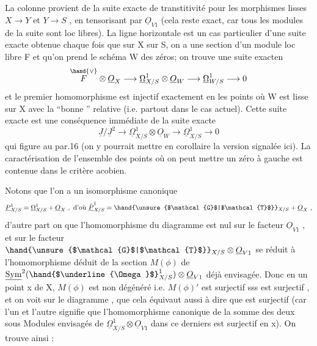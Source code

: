 
La colonne provient de la suite exacte de transtitivité pour les
morphismes lisses $X\to Y$ et $Y\to S$ , en  tensorisant par $\underline{O}_{V1}$ (cela reste
exact, car tous les modules de la suite sont loc libres). La ligne
horizontale est un cas particulier d'une suite exacte obtenue chaque
fois que sur X  sur S, on a une section \unsure{$\phi$} d'un module loc libre F
et qu'on prend le schéma W des zéros; on trouve une suite exacten
\[ \overset{\hand{\vee}}{F}\otimes \underline{O}_X \longrightarrow \underline{\Omega}^1_{X/S}\otimes \underline{O}_W \longrightarrow \underline{\Omega}^1_{W/S} \longrightarrow 0 \]
et  le premier homomorphisme est injectif exactement en les points où
W est lisse sur X avec la ``bonne ''  relative (i.e. partout dans
le cas actuel).  Cette suite exacte est 
  une
conséquence immédiate de la suite exacte
\[ \underline{J}/\underline{J}^2\longrightarrow \underline{\Omega}^1_{X/S}\otimes \underline{O}_W \longrightarrow \underline{\Omega}^1_{X/S} \longrightarrow 0 \]
\margin{16 \textbar} qui figure au par.16 (on y pourrait mettre en corollaire la version
signalée ici). La caractérisation de l'ensemble des points où on
peut mettre un zéro à gauche est contenue dans le critère acobien.

Notons que l'on a un isomorphisme canonique
\[ \underline{P}^1_{X/S} = \underline{\Omega}^1_{X/S} + \underline{O}_X \ ,\ \text{d'où}\ \check{\underline{P}}^1_{X/S} = \hand{\unsure{$\mathcal{G}$|$\mathcal{T}$}}_{X/S} + \underline{O}_X \ , \]
d'autre part on  que l'homomorphisme  \hand{$\mu$} du diagramme  est nul
sur le facteur $\underline{O}_{V1}$ , et sur le facteur $\hand{\unsure{$\mathcal{G}$|$\mathcal{T}$}}_{X/S}\otimes\underline{O}_{V1}$  se réduit à
l'homomorphisme  déduit de la section $M(\phi)$ de $\underline{\mathrm{Sym}}^2(\hand{$\underline{\Omega}$}^1_{X/S})\otimes \underline{O}_{V1}$ déjà
envisagée. Donc en un point x de X, $M(\phi)$ est non dégénéré i.e. $M(\phi)'$
est surjectif sss \hand{$\mu$} est surjectif , et on voit sur le diagramme ,
que cela équivaut aussi à dire que \unsure{\hand{$\nu$}} est surjectif  (car l'un et l'autre
signifie que l'homomorphisme canonique de la somme des deux sous
Modules envisagés de $\underline{\Omega}^1_{X/S}\otimes \underline{O}_{V1}$ dans ce derniers est surjectif en
x). On trouve ainsi :

